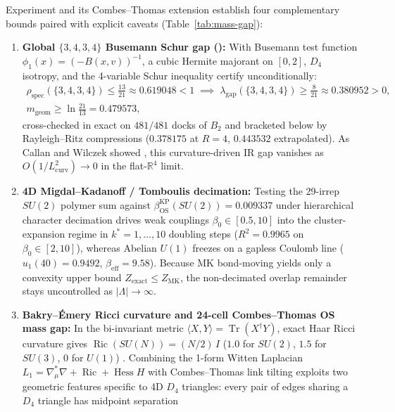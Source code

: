 Experiment  and its Combes--Thomas extension establish four complementary bounds paired with explicit
caveats (Table~\ref{tab:mass-gap}):
\begin{enumerate}[itemsep=2pt]
\item \textbf{Global $\{3,4,3,4\}$ Busemann Schur gap ():} With Busemann test function
$\phi_1(x) = (-B(x, v))^{-1}$, a cubic Hermite majorant on $[0, 2]$, $D_4$ isotropy, and the 4-variable Schur
inequality certify unconditionally:
\begin{gather}
\rho_{\mathrm{spec}}(\{3,4,3,4\}) \le \frac{13}{21} \approx 0.619048 < 1
\;\implies\;
\lambda_{\mathrm{gap}}(\{3,4,3,4\}) \ge \frac{8}{21} \approx 0.380952 > 0, \nonumber\\
m_{\mathrm{geom}} \ge \ln\!\frac{21}{13} = 0.479573,
\label{eq:schur-gap}
\end{gather}
cross-checked in exact  on $481/481$ docks of $B_2$ and bracketed below by Rayleigh--Ritz compressions
($0.378175$ at $R = 4$, $0.443532$ extrapolated). As Callan and Wilczek showed \cite{callan1990}, this curvature-driven
IR gap vanishes as $O(1/L_{\mathrm{curv}}^2) \to 0$ in the flat-$\mathbb{R}^4$ limit.
\item \textbf{4D Migdal--Kadanoff / Tomboulis decimation:} Testing the 29-irrep $SU(2)$ polymer sum against
$\beta_{\mathrm{OS}}^{\mathrm{KP}}(SU(2)) = 0.009337$ under hierarchical character decimation \cite{tomboulis1983}
drives weak couplings $\beta_0 \in [0.5, 10]$ into the cluster-expansion regime in $k^* = 1, \dots, 10$ doubling steps
($R^2 = 0.9965$ on $\beta_0 \in [2, 10]$), whereas Abelian $U(1)$ freezes on a gapless Coulomb line
($u_1(40) = 0.9492$, $\beta_{\mathrm{eff}} = 9.58$). Because MK bond-moving yields only a convexity upper bound
$Z_{\mathrm{exact}} \le Z_{\mathrm{MK}}$, the non-decimated overlap remainder stays uncontrolled as
$|\Lambda| \to \infty$.
\item \textbf{Bakry--\'Emery Ricci curvature and 24-cell Combes--Thomas OS mass gap:} In the bi-invariant metric
$\langle X, Y \rangle = \operatorname{Tr}(X^\dagger Y)$, exact Haar Ricci curvature gives
$\operatorname{Ric}(SU(N)) = (N/2)\,I$ ($1.0$ for $SU(2)$, $1.5$ for $SU(3)$, $0$ for $U(1)$) \cite{bakry1985}.
Combining the 1-form Witten Laplacian $L_1 = \nabla_\mu^* \nabla + \operatorname{Ric} + \operatorname{Hess} H$
\cite{helffer1994, bodineau1999} with Combes--Thomas link tilting \cite{combes1973} exploits two geometric features
specific to 4D $D_4$ triangles: every pair of edges sharing a $D_4$ triangle has midpoint separation

\end{enumerate}
